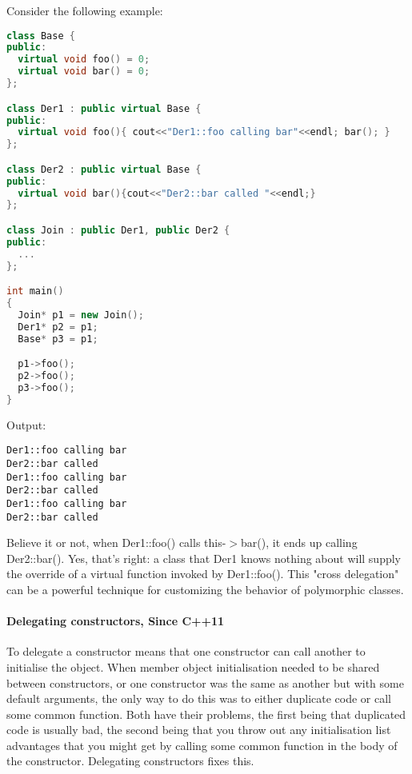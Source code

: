 \documentclass{book}
\begin{document}
Consider the following example:
\begin{lstlisting}[caption={delegation example code}, language=C++]
class Base {
public:
  virtual void foo() = 0;
  virtual void bar() = 0;
};

class Der1 : public virtual Base {
public:
  virtual void foo(){ cout<<"Der1::foo calling bar"<<endl; bar(); }
};

class Der2 : public virtual Base {
public:
  virtual void bar(){cout<<"Der2::bar called "<<endl;}
};

class Join : public Der1, public Der2 {
public:
  ...
};

int main()
{
  Join* p1 = new Join();
  Der1* p2 = p1;
  Base* p3 = p1;

  p1->foo();
  p2->foo();
  p3->foo();
}
\end{lstlisting}
Output:
\begin{verbatim}
Der1::foo calling bar
Der2::bar called 
Der1::foo calling bar
Der2::bar called 
Der1::foo calling bar
Der2::bar called 
\end{verbatim}
Believe it or not, when Der1::foo() calls this-$>$bar(), it ends up calling Der2::bar().
Yes, that's right: a class that Der1 knows nothing about will supply the override of a virtual function invoked by Der1::foo().
This "cross delegation" can be a powerful technique for customizing the behavior of polymorphic classes. 
\paragraph{Delegating constructors, Since C++11}
To delegate a constructor means that one constructor can call another to initialise the object.
When member object initialisation needed to be shared between constructors, or one constructor was the same as another but with some default arguments,
the only way to do this was to either duplicate code or call some common function.
Both have their problems, the first being that duplicated code is usually bad,
the second being that you throw out any initialisation list advantages that you might get by calling some common function in the body of the constructor.
Delegating constructors fixes this.
\end{document}
